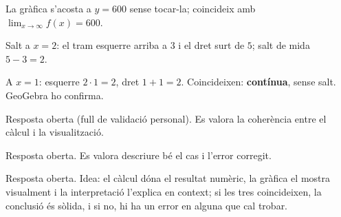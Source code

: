 \begin{solucions}
\begin{sollist}
  \item La gràfica s'acosta a $y=600$ sense tocar-la; coincideix amb
        $\lim_{x\to\infty}f(x)=600$.
  \item Salt a $x=2$: el tram esquerre arriba a $3$ i el dret surt de $5$; salt de mida
        $5-3=2$.
  \item A $x=1$: esquerre $2\cdot 1=2$, dret $1+1=2$. Coincideixen: \textbf{contínua},
        sense salt. GeoGebra ho confirma.
  \item Resposta oberta (full de validació personal). Es valora la coherència entre el
        càlcul i la visualització.
  \item Resposta oberta. Es valora descriure bé el cas i l'error corregit.
  \item Resposta oberta. Idea: el càlcul dóna el resultat numèric, la gràfica el mostra
        visualment i la interpretació l'explica en context; si les tres coincideixen, la
        conclusió és sòlida, i si no, hi ha un error en alguna que cal trobar.
\end{sollist}
\end{solucions}
